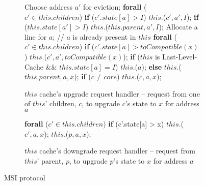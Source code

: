 \begin{figure}
\small

\begin{subfigure}{\linewidth}
\begin{boxedminipage}{\linewidth}
\begin{algorithmic}
        \State Choose address $a'$ for eviction;
        \State \textbf{forall} ($c' \in this.children$)
        \State \;\;\;\; \textbf{if} ($c'.state[a] > I$)
        \State \;\;\;\;\;\;\;\; \call{} $this.$\dReqL($c', a', I$);
        \State \textbf{if} ($this.state[a'] > I$)
        \State \;\;\;\; \call{} $this.$\dResp{}($this.parent, a', I$);
      \EndIf
      \State Allocate a line for $a$;
    \EndIf
    \State // $a$ is already present in $this$
    \State \textbf{forall} ($c' \in this.children$)
    \State \;\;\;\; \textbf{if} ($c'.state[a] > toCompatible(x)$)
    \State \;\;\;\;\;\;\;\; \call{} $this.$\dReqL($c', a', toCompatible(x)$);
    \State \textbf{if} ($this$ is Last-Level-Cache \&\& $this.state[a] = I$)
    \State \;\;\;\; \call{} $this$.\sendMem{}($a$);
    \State \textbf{else}
    \State \;\;\;\; \call{} $this.$\uReqL{}($this.parent, a, x$);
  \State \textbf{if} ($c \neq core$)
  \State \;\;\;\; \call{} $this$.\uResp{}($c, a, x$);
  \EndIf
\EndProc
\end{algorithmic}
\end{boxedminipage}
\caption{$this$ cache's upgrade request handler -- request from one of $this$' children, $c$, to upgrade $c$'s state to $x$ for address $a$ }
\label{atomicUReq1}
\end{subfigure}

\begin{subfigure}{\linewidth}
\begin{boxedminipage}{\linewidth}
\begin{algorithmic}
    \State \textbf{forall} ($c' \in this.children$)
    \State \;\;\;\; \textbf{if} (c'.state[a] > x)
    \State \;\;\;\;\;\;\;\; \call{} $this.$\dReqL($c', a, x$);
    \State \call{} $this.$\dResp($p, a, x$);
  \EndIf
\EndProc
\end{algorithmic}
\end{boxedminipage}
\caption{$this$ cache's downgrade request handler -- request from $this$'
parent, $p$, to upgrade $p$'s state to $x$ for address $a$ }
\label{atomicDReq1}
\end{subfigure}

\caption{MSI protocol}
\label{msi-template}
\end{figure}


